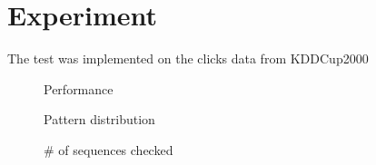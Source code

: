 \documentclass[journal]{IEEEtran}
\begin{document}
\section{Experiment}
The test was implemented on the clicks data from KDDCup2000 

\begin{figure}[H]
\caption*{Performance}
\caption*{Pattern distribution}
\caption*{\# of sequences checked}
\end{figure}
\end{document}
